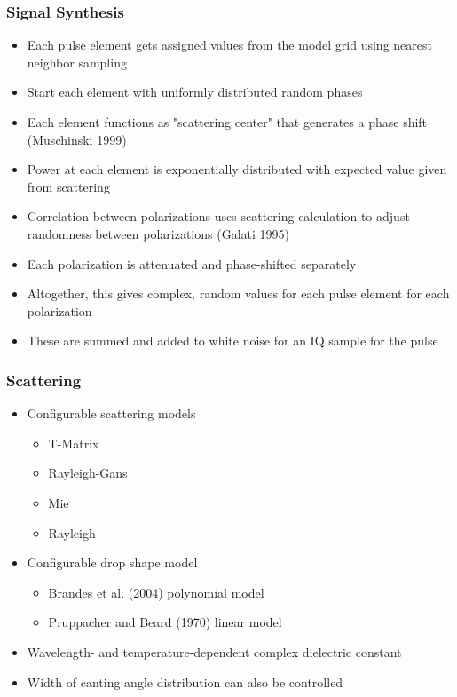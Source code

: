 \documentclass[red]{beamer}
\begin{document}
\begin{frame}[<+->]
	\frametitle{Signal Synthesis}
	\begin{itemize}
		\item Each pulse element gets assigned values from the model grid using nearest
		neighbor sampling
		\item Start each element with uniformly distributed random phases
		\item Each element functions as "scattering center" that generates
		a phase shift (Muschinski 1999)
		\item Power at each element is exponentially distributed with expected value
		given from scattering 
		\item Correlation between polarizations uses scattering calculation
		to adjust randomness between polarizations (Galati 1995)
		\item Each polarization is attenuated and phase-shifted separately
		\item Altogether, this gives complex, random values for each pulse element for 
		each polarization
		\item These are summed and added to white noise for an IQ sample for the pulse
	\end{itemize}
\end{frame}

\begin{frame}
	\frametitle{Scattering}
	\begin{itemize}
		\item Configurable scattering models
		\begin{itemize}
			\item T-Matrix
			\item Rayleigh-Gans
			\item Mie
			\item Rayleigh
			\end{itemize}
		\item Configurable drop shape model
		\begin{itemize}
			\item Brandes et al. (2004) polynomial model
			\item Pruppacher and Beard (1970) linear model
			\end{itemize}
		\item Wavelength- and temperature-dependent complex dielectric constant
		\item Width of canting angle distribution can also be controlled
	\end{itemize}
\end{frame}
\end{document}
